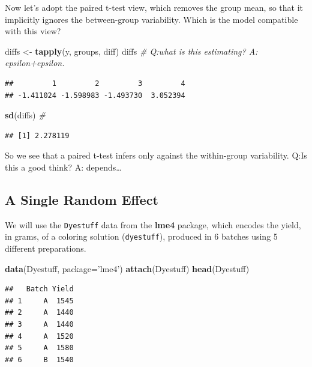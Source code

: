 \documentclass[]{book}
\newenvironment{Shaded}{\begin{snugshade}}{\end{snugshade}}
\newcommand{\CommentTok}[1]{\textcolor[rgb]{0.56,0.35,0.01}{\textit{#1}}}
\newcommand{\DataTypeTok}[1]{\textcolor[rgb]{0.13,0.29,0.53}{#1}}
\newcommand{\KeywordTok}[1]{\textcolor[rgb]{0.13,0.29,0.53}{\textbf{#1}}}
\newcommand{\NormalTok}[1]{#1}
\newcommand{\StringTok}[1]{\textcolor[rgb]{0.31,0.60,0.02}{#1}}
\theoremstyle{definition}
\theoremstyle{definition}
\theoremstyle{definition}
\theoremstyle{remark}
\begin{document}
Now let's adopt the paired t-test view, which removes the group mean, so that it implicitly ignores the between-group variability. Which is the model compatible with this view?

\begin{Shaded}
\begin{Highlighting}[]
\NormalTok{diffs <-}\StringTok{ }\KeywordTok{tapply}\NormalTok{(y, groups, diff) }
\NormalTok{diffs }\CommentTok{# Q:what is this estimating? A: epsilon+epsilon.}
\end{Highlighting}
\end{Shaded}

\begin{verbatim}
##         1         2         3         4 
## -1.411024 -1.598983 -1.493730  3.052394
\end{verbatim}

\begin{Shaded}
\begin{Highlighting}[]
\KeywordTok{sd}\NormalTok{(diffs) }\CommentTok{# }
\end{Highlighting}
\end{Shaded}

\begin{verbatim}
## [1] 2.278119
\end{verbatim}

So we see that a paired t-test infers only against the within-group variability.
Q:Is this a good think?
A: depends\ldots{}

\hypertarget{a-single-random-effect}{%
\subsection{A Single Random Effect}\label{a-single-random-effect}}

We will use the \texttt{Dyestuff} data from the \textbf{lme4} package, which encodes the yield, in grams, of a coloring solution (\texttt{dyestuff}), produced in 6 batches using 5 different preparations.

\begin{Shaded}
\begin{Highlighting}[]
\KeywordTok{data}\NormalTok{(Dyestuff, }\DataTypeTok{package=}\StringTok{'lme4'}\NormalTok{)}
\KeywordTok{attach}\NormalTok{(Dyestuff)}
\KeywordTok{head}\NormalTok{(Dyestuff)}
\end{Highlighting}
\end{Shaded}

\begin{verbatim}
##   Batch Yield
## 1     A  1545
## 2     A  1440
## 3     A  1440
## 4     A  1520
## 5     A  1580
## 6     B  1540
\end{verbatim}
\end{document}
